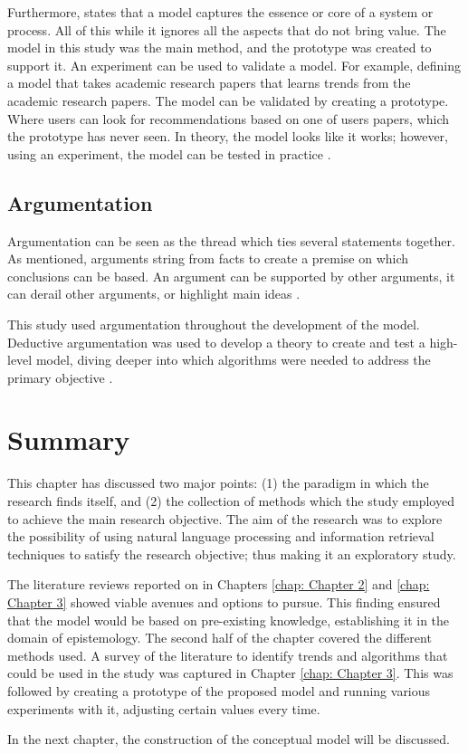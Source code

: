 Furthermore,  states that a model captures the essence or core of a system or process. All of this while it ignores all the aspects that do not bring value. The model in this study was the main method, and the prototype was created to support it. An experiment can be used to validate a model. For example, defining a model that takes academic research papers that learns trends from the academic research papers. The model can be validated by creating a prototype. Where users can look for recommendations based on one of users papers, which the prototype has never seen. In theory, the model looks like it works; however, using an experiment, the model can be tested in practice \cite{Steenkamp2007}.

\subsection{Argumentation}

Argumentation can be seen as the thread which ties several statements together. As mentioned, arguments string from facts to create a premise on which conclusions can be based. An argument can be supported by other arguments, it can derail other arguments, or highlight main ideas \cite{walton2009argumentation}. 

This study used argumentation throughout the development of the model. Deductive argumentation was used to develop a theory to create and test a high-level model, diving deeper into which algorithms were needed to address the primary objective \cite{VanHaaften2016}.

\section{Summary}

This chapter has discussed two major points: (1) the paradigm in which the research finds itself, and (2) the collection of methods which the study employed to achieve the main research objective. The aim of the research was to explore the possibility of using natural language processing and information retrieval techniques to satisfy the research objective; thus making it an exploratory study.

The literature reviews reported on in Chapters \ref{chap: Chapter 2} and \ref{chap: Chapter 3} showed viable avenues and options to pursue. This finding ensured that the model would be based on pre-existing knowledge, establishing it in the domain of epistemology. The second half of the chapter covered the different methods used. A survey of the literature to identify trends and algorithms that could be used in the study was captured in Chapter \ref{chap: Chapter 3}. This was followed by creating a prototype of the proposed model and running various experiments with it, adjusting certain values every time.

In the next chapter, the construction of the conceptual model will be discussed.
